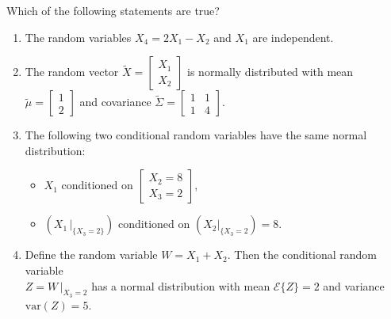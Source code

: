 \documentclass[letterpaper]{article}
\begin{document}
\begin{enumerate}
    Which of the following statements are true?
    \begin{enumerate}
        \setlength{\itemsep}{.15in}
        \renewcommand{\labelenumi}{(\alph{enumi})}
        \setlength{\itemsep}{.1in}
        \item The random variables $X_{4} = 2X_{1}-X_{2}$ and $X_{1}$ are independent.
        \item The random vector $\tilde{X }= \begin{bmatrix}X_{1}\\X_{2}\end{bmatrix}$ is normally distributed with
         mean $\tilde{\mu}=\begin{bmatrix}1\\2\end{bmatrix} $ and covariance $\tilde{\Sigma}=\begin{bmatrix}1 & 1\\ 1&4 \end{bmatrix}$.

        \item The following two conditional random variables have the same normal distribution:
             \begin{itemize}
               \item $X_{1}$ conditioned on $\begin{bmatrix}X_{2} =8\\ X_{3}=2\end{bmatrix}$,
               \item $(X_{1}\,|_{\{X_{3} =2\}})$ conditioned on $\left(X_{2}|_{\{ X_3=2}\right)=8$.
             \end{itemize}

        \item Define the random variable $W=X_{1}+ X_{2}$.  Then the conditional random variable \\
        $Z = W\,\Big|_{ X_{3}=2}$ has a normal distribution with mean $\mathcal{E}\{Z\}=2$ and variance $\mathrm{var}(Z)=5$.
    \end{enumerate}
\end{enumerate}

%
%
%
%
%
\end{document}
